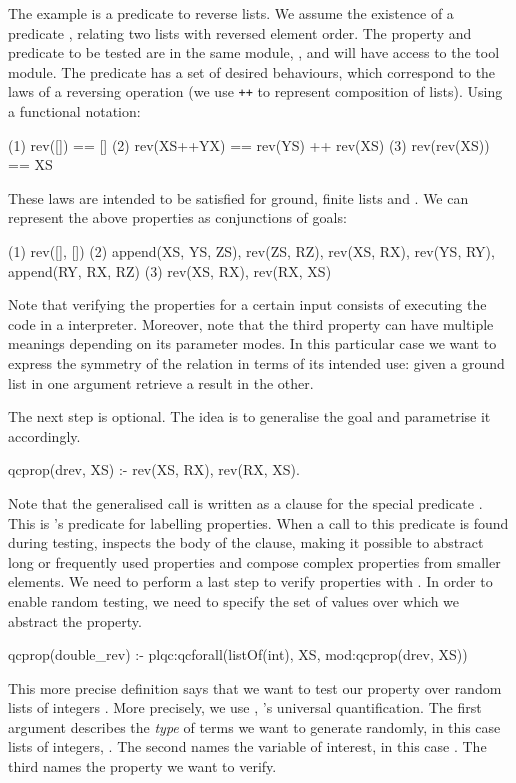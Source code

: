 The example is a predicate to reverse lists.
%
We assume the existence of a predicate , relating two lists
with reversed element order.
%
The property and predicate to be tested are in the same module,
, and will have access to the \plqc{} tool module.
%
The  predicate has a set of desired behaviours, which
correspond to the laws of a reversing operation (we use \texttt{++} to
represent composition of lists).
%
Using a functional notation:
{
\begin{code}
(1)        rev([])     == []
(2)     rev(XS++YX)    == rev(YS) ++ rev(XS)
(3)      rev(rev(XS))  == XS
\end{code}
}
These laws are intended to be satisfied for ground, finite lists
 and .
%
We can represent the above properties as conjunctions of \Prolog{}
goals:
%
\begin{yapcode}
  (1)  rev([], [])
  (2)  append(XS, YS, ZS), rev(ZS, RZ),
        rev(XS, RX), rev(YS, RY),
         append(RY, RX, RZ)
  (3)  rev(XS, RX), rev(RX, XS)
\end{yapcode}
%
Note that verifying the properties for a certain input consists of
executing the code in a \Prolog{} interpreter.
%
Moreover, note that the third property can have multiple meanings
depending on its parameter modes.
%
In this particular case we want to express the symmetry of the
 relation in terms of its intended use: given a ground
list in one argument retrieve a result in the other.


The next step is optional.
%
The idea is to generalise the goal and parametrise it accordingly.
%
\begin{yapcode}
 qcprop({drev, XS}) :-
   rev(XS, RX), rev(RX, XS).
\end{yapcode}
%
Note that the generalised call is  written as a clause for the special
predicate . %
%
This is \plqc{}'s predicate for labelling properties.
%
When a call to this predicate is found during testing, \plqc{} inspects
the body of the clause, making it possible to abstract long or
frequently used properties and compose complex properties from smaller
elements.
%
We need to perform a last step to verify properties with \plqc{}.
%
In order to enable random testing, we
need to specify the set of values over which we abstract the property.
%
\begin{yapcode}
 qcprop(double_rev) :-
   plqc:qcforall(listOf(int), XS,
                 mod:qcprop({drev, XS}))
\end{yapcode}
%
This more precise definition says that we want to test our 
property over random lists of integers .
%
More precisely, we use , \plqc{}'s universal quantification.
%
The first argument describes the \emph{type} of terms we want to
generate randomly, in this case lists of integers,
.
%
The second names the variable of interest, in this case .
%
The third names the property we want to verify.


